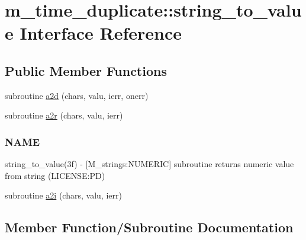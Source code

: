 \hypertarget{interfacem__time__duplicate_1_1string__to__value}{}\section{m\+\_\+time\+\_\+duplicate\+:\+:string\+\_\+to\+\_\+value Interface Reference}
\label{interfacem__time__duplicate_1_1string__to__value}
\subsection*{Public Member Functions}
\begin{DoxyCompactItemize}
\item 
subroutine \mbox{\hyperlink{interfacem__time__duplicate_1_1string__to__value_a81a491b89a4fe7003a90feb4a9bf1963}{a2d}} (chars, valu, ierr, onerr)
\item 
subroutine \mbox{\hyperlink{interfacem__time__duplicate_1_1string__to__value_a88d08758f4f106adce30c34597a53fd1}{a2r}} (chars, valu, ierr)
\begin{DoxyCompactList}\small\item\em \subsubsection*{N\+A\+ME}

string\+\_\+to\+\_\+value(3f) -\/ \mbox{[}M\+\_\+strings\+:N\+U\+M\+E\+R\+IC\mbox{]} subroutine returns numeric value from string (L\+I\+C\+E\+N\+SE\+:PD) \end{DoxyCompactList}\item 
subroutine \mbox{\hyperlink{interfacem__time__duplicate_1_1string__to__value_ac7694e67b91618807e4334ae33700335}{a2i}} (chars, valu, ierr)
\end{DoxyCompactItemize}


\subsection{Member Function/\+Subroutine Documentation}
\mbox{\label{interfacem__time__duplicate_1_1string__to__value_a81a491b89a4fe7003a90feb4a9bf1963}} 
